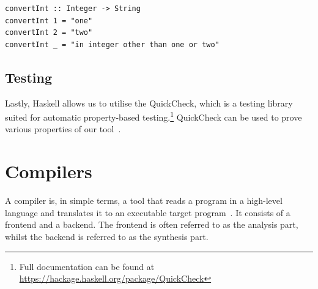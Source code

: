 \begin{lstlisting}[caption={A simple Haskell function converting values of type Integer to its string equivalent}, captionpos=b]
convertInt :: Integer -> String
convertInt 1 = "one"
convertInt 2 = "two"
convertInt _ = "in integer other than one or two"
\end{lstlisting}

\subsection{Testing}

Lastly, Haskell allows us to utilise the QuickCheck, which is a testing library suited for automatic property-based testing.\footnote{Full documentation can be found at \url{https://hackage.haskell.org/package/QuickCheck}} QuickCheck can be used to prove various properties of our tool~\cite{DBLP:conf/icfp/ClaessenH00}.

\section{Compilers}

A compiler is, in simple terms, a tool that reads a program in a high-level language and translates it to an executable target program~\cite{DBLP:books/aw/AhoSU86}. It consists of a frontend and a backend. The frontend is often referred to as the analysis part, whilst the backend is referred to as the synthesis part. \hfill \\

